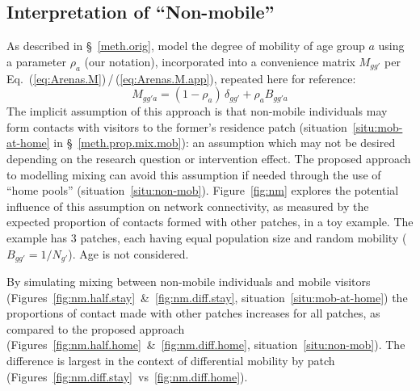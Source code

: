 \subsection{Interpretation of ``Non-mobile''}\label{app.non-mob}
As described in \S~\ref{meth.orig}, \citet{Arenas2020} model the degree of mobility of age group $a$
using a parameter $\rho_a$ (our notation),
incorporated into a convenience matrix $M_{gg'}$ per Eq.~(\ref{eq:Arenas.M})\,/\,(\ref{eq:Arenas.M.app}),
repeated here for reference:
\begin{equation}\label{eq:Arenas.M.app}
  M_{gg'a} = (1-\rho_a)\,\delta_{gg'} + \rho_a B_{gg'a}
\end{equation}
The implicit assumption of this approach is that
non-mobile individuals may form contacts with visitors to the former's residence patch
(situation~\ref{situ:mob-at-home} in \S~\ref{meth.prop.mix.mob}):
an assumption which may not be desired depending on the research question or intervention effect.
The proposed approach to modelling mixing can avoid this assumption if needed
through the use of ``home pools'' (situation~\ref{situ:non-mob}).
Figure~\ref{fig:nm} explores the potential influence of this assumption on network connectivity,
as measured by the expected proportion of contacts formed with other patches, in a toy example.
The example has 3 patches, each having equal population size and random mobility ($B_{gg'} = 1/N_{g'}$).
Age is not considered.
\par
By simulating mixing between non-mobile individuals and mobile visitors
(Figures~\ref{fig:nm.half.stay}~\&~\ref{fig:nm.diff.stay}, situation~\ref{situ:mob-at-home})
the proportions of contact made with other patches increases for all patches,
as compared to the proposed approach
(Figures~\ref{fig:nm.half.home}~\&~\ref{fig:nm.diff.home}, situation~\ref{situ:non-mob}).
The difference is largest in the context of differential mobility by patch
(Figures~\ref{fig:nm.diff.stay}~vs~\ref{fig:nm.diff.home}).
\par
